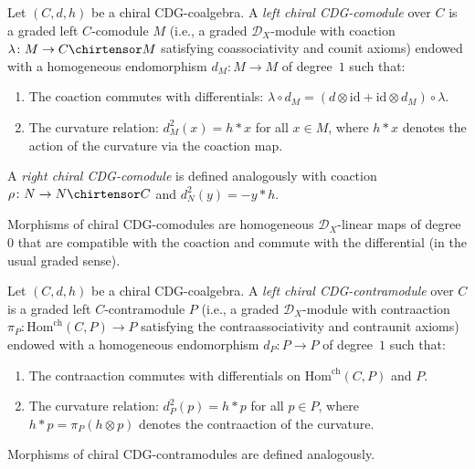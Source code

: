 \begin{definition}\label{def:chiral-CDG-comodule}
Let $(C, d, h)$ be a chiral CDG-coalgebra.  A \emph{left chiral
CDG-comodule} over $C$ is a graded left $C$-comodule $M$
(i.e., a graded $\mathcal{D}_X$-module with coaction
$\lambda\colon M \to C \chirtensor M$ satisfying coassociativity
and counit axioms) endowed with a homogeneous endomorphism
$d_M\colon M \to M$ of degree~$1$ such that:
\begin{enumerate}
\item The coaction commutes with differentials:
  $\lambda \circ d_M = (d \otimes \mathrm{id} + \mathrm{id} \otimes d_M) \circ \lambda$.
\item The curvature relation:
  $d_M^2(x) = h \ast x$ for all $x \in M$,
  where $h \ast x$ denotes the action of the curvature
  via the coaction map.
\end{enumerate}

A \emph{right chiral CDG-comodule} is defined analogously with
coaction $\rho\colon N \to N \chirtensor C$ and
$d_N^2(y) = -y \ast h$.

Morphisms of chiral CDG-comodules are homogeneous $\mathcal{D}_X$-linear
maps of degree~$0$ that are compatible with the coaction
and commute with the differential (in the usual graded sense).
\end{definition}

\begin{definition}\label{def:chiral-CDG-contramodule}
Let $(C, d, h)$ be a chiral CDG-coalgebra.  A \emph{left chiral
CDG-contramodule} over $C$ is a graded left $C$-contramodule $P$
(i.e., a graded $\mathcal{D}_X$-module with contraaction
$\pi_P\colon \mathrm{Hom}^{\mathrm{ch}}(C, P) \to P$
satisfying the contraassociativity and contraunit axioms)
endowed with a
homogeneous endomorphism $d_P\colon P \to P$ of degree~$1$ such that:
\begin{enumerate}
\item The contraaction commutes with differentials on
  $\mathrm{Hom}^{\mathrm{ch}}(C, P)$ and $P$.
\item The curvature relation:
  $d_P^2(p) = h \ast p$ for all $p \in P$,
  where $h \ast p = \pi_P(h \otimes p)$ denotes the contraaction
  of the curvature.
\end{enumerate}
Morphisms of chiral CDG-contramodules are defined analogously.
\end{definition}

